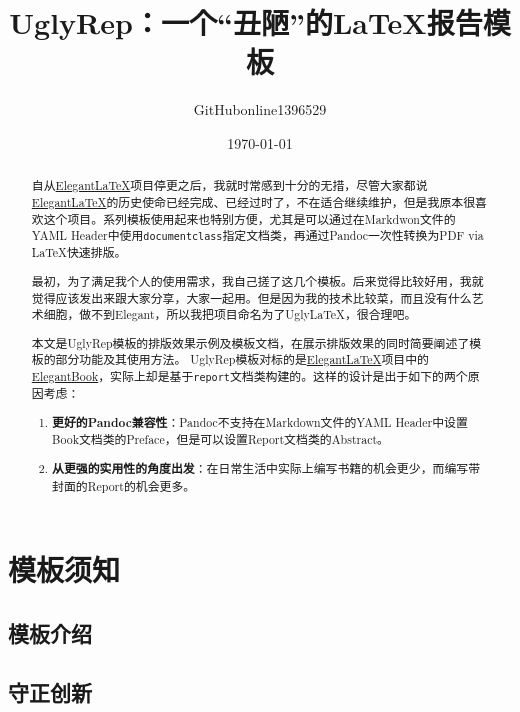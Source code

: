 \documentclass[12pt, green, textbook]{uglyrep}
\title{\bfseries UglyRep：一个“丑陋”的\LaTeX{}报告模板}
\author{GitHubonline1396529}
\date{\today}
\begin{document}
\maketitle
\begin{abstract}
  自从\href{https://github.com/ElegantLaTeX/}{Elegant\LaTeX}项目停更之后，我就时常感到十分的无措，尽管大家都说\href{https://github.com/ElegantLaTeX/}{Elegant\LaTeX}的历史使命已经完成、已经过时了，不在适合继续维护，但是我原本很喜欢这个项目。系列模板使用起来也特别方便，尤其是可以通过在Markdwon文件的YAML Header中使用\texttt{documentclass}指定文档类，再通过Pandoc一次性转换为PDF via \LaTeX{}快速排版。

  最初，为了满足我个人的使用需求，我自己搓了这几个模板。后来觉得比较好用，我就觉得应该发出来跟大家分享，大家一起用。但是因为我的技术比较菜，而且没有什么艺术细胞，做不到Elegant，所以我把项目命名为了Ugly\LaTeX{}，很合理吧。

  本文是UglyRep模板的排版效果示例及模板文档，在展示排版效果的同时简要阐述了模板的部分功能及其使用方法。%
  UglyRep模板对标的是\href{https://github.com/ElegantLaTeX/}{Elegant\LaTeX}项目中的\href{https://github.com/ElegantLaTeX/ElegantBook}{ElegantBook}，实际上却是基于\texttt{report}文档类构建的。这样的设计是出于如下的两个原因考虑：

  \begin{enumerate}
    \item \textbf{更好的Pandoc兼容性}：Pandoc不支持在Markdown文件的YAML Header中设置Book文档类的Preface，但是可以设置Report文档类的Abstract。
    \item \textbf{从更强的实用性的角度出发}：在日常生活中实际上编写书籍的机会更少，而编写带封面的Report的机会更多。
  \end{enumerate}

\end{abstract}

\tableofcontents

\chapter{模板须知}
\section{模板介绍}


\section{守正创新}

\end{document}

